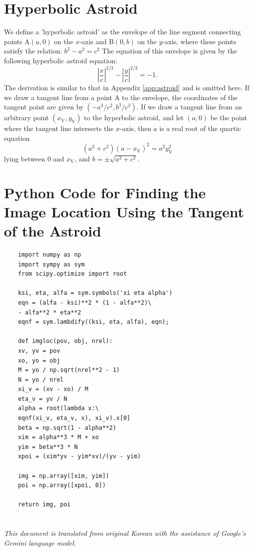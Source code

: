 \documentclass[twocolumn]{article}
\begin{document}
\section{Hyperbolic Astroid} \label{app:hyperastroid}
We define a 'hyperbolic astroid' as the envelope of the line segment connecting points A$(a, 0)$ on the $x$-axis and B$(0, b)$ on the $y$-axis, where these points satisfy the relation:
$b^2-a^2=c^2$
The equation of this envelope is given by the following hyperbolic astroid equation:
$$ \left|\dfrac{x}{c}\right|^{2/3} - \left|\dfrac{y}{c}\right|^{2/3} = -1. $$
The derivation is similar to that in Appendix \ref{app:astroid} and is omitted here.
If we draw a tangent line from a point A to the envelope, the coordinates of the tangent point are given by $(-a^3/c^2, b^3/c^2)$. 
If we draw a tangent line from an arbitrary point $(x_{\mathrm{V}^{}}, y_{\mathrm{V}}^{})$ to the hyperbolic astroid, and let $(a,0)$ be the point where the tangent line intersects the $x$-axis, then $a$ is a real root of the quartic equation
$$ \left( a^2 + c^2 \right) \left(a - x_{\mathrm{V}}^{} \right)^2 = a^2 y_{\mathrm{V}}^2$$
lying between $0$ and $x_{\mathrm{V}^{}}$, and $b = \pm \sqrt{a^2 + c^2}$.

\section{Python Code for Finding the Image Location Using the Tangent of the Astroid} \label{app:python}
\begin{verbatim}
	import numpy as np
	import sympy as sym
	from scipy.optimize import root
	
	ksi, eta, alfa = sym.symbols('xi eta alpha')
	eqn = (alfa - ksi)**2 * (1 - alfa**2)\
	- alfa**2 * eta**2
	eqnf = sym.lambdify((ksi, eta, alfa), eqn);
	
	def imgloc(pov, obj, nrel):
	xv, yv = pov
	xo, yo = obj
	M = yo / np.sqrt(nrel**2 - 1)
	N = yo / nrel
	xi_v = (xv - xo) / M
	eta_v = yv / N
	alpha = root(lambda x:\
	eqnf(xi_v, eta_v, x), xi_v).x[0]
	beta = np.sqrt(1 - alpha**2)
	xim = alpha**3 * M + xo
	yim = beta**3 * N
	xpoi = (xim*yv - yim*xv)/(yv - yim)
	
	img = np.array([xim, yim])
	poi = np.array([xpoi, 0])
	
	return img, poi
\end{verbatim}

\vfill
\section*{}
\slshape{This document is translated from original Korean with the assistance of Google's Gemini language model.}
\end{document}
